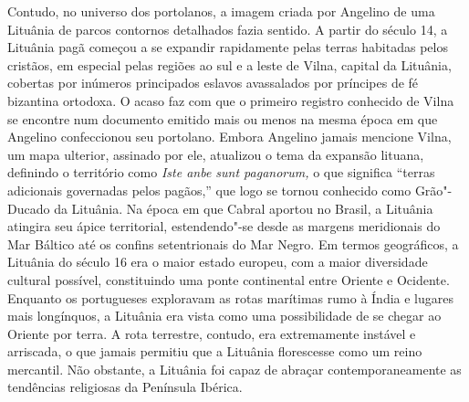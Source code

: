Contudo, no universo dos portolanos, a imagem criada por Angelino de uma
Lituânia de parcos contornos detalhados fazia sentido. A partir do
século 14, a Lituânia pagã começou a se expandir rapidamente pelas
terras habitadas pelos cristãos, em especial pelas regiões ao sul e a
leste de Vilna, capital da Lituânia, cobertas por inúmeros principados
eslavos avassalados por príncipes de fé bizantina ortodoxa. O acaso faz
com que o primeiro registro conhecido de Vilna se encontre num documento
emitido mais ou menos na mesma época em que Angelino confeccionou seu
portolano. Embora Angelino jamais mencione Vilna, um mapa ulterior,
assinado por ele, atualizou o tema da expansão lituana, definindo o
território como \textit{Iste anbe sunt paganorum,} o que significa
``terras adicionais governadas pelos pagãos,'' que logo se tornou
conhecido como Grão"-Ducado da Lituânia. Na época em que Cabral aportou
no Brasil, a Lituânia atingira seu ápice territorial, estendendo"-se
desde as margens meridionais do Mar Báltico até os confins setentrionais
do Mar Negro. Em termos geográficos, a Lituânia do século 16 era o maior
estado europeu, com a maior diversidade cultural possível, constituindo
uma ponte continental entre Oriente e Ocidente. Enquanto os portugueses
exploravam as rotas marítimas rumo à Índia e lugares mais longínquos, a
Lituânia era vista como uma possibilidade de se chegar ao Oriente por
terra. A rota terrestre, contudo, era extremamente instável e arriscada,
o que jamais permitiu que a Lituânia florescesse como um reino
mercantil. Não obstante, a Lituânia foi capaz de abraçar
contemporaneamente as tendências religiosas da Península Ibérica.

